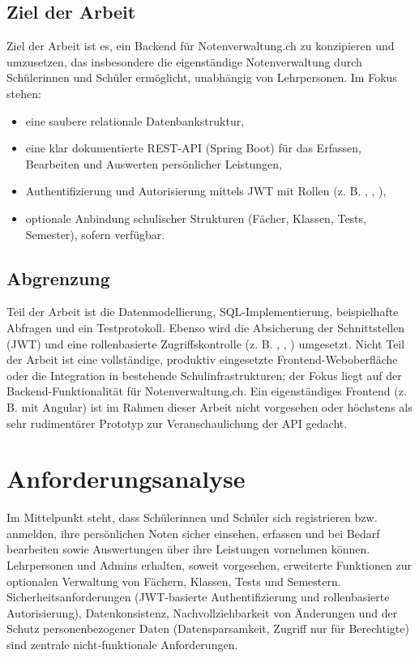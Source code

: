 \documentclass[12pt,a4paper]{article}
\newcommand{\code}[1]{\texttt{\detokenize{#1}}}
\begin{document}
    \subsection{Ziel der Arbeit}
    Ziel der Arbeit ist es, ein Backend für Notenverwaltung.ch zu konzipieren und umzusetzen,
    das insbesondere die eigenständige Notenverwaltung durch Schülerinnen und Schüler ermöglicht, unabhängig von Lehrpersonen. Im Fokus stehen:
    \begin{itemize}
        \item eine saubere relationale Datenbankstruktur,
        \item eine klar dokumentierte REST-API (Spring Boot) für das Erfassen, Bearbeiten und Auswerten persönlicher Leistungen,
        \item Authentifizierung und Autorisierung mittels JWT mit Rollen (z. B. \code{STUDENT}, \code{TEACHER}, \code{ADMIN}),
        \item optionale Anbindung schulischer Strukturen (Fächer, Klassen, Tests, Semester), sofern verfügbar.
    \end{itemize}

    \subsection{Abgrenzung}
    Teil der Arbeit ist die Datenmodellierung, SQL-Implementierung, beispielhafte Abfragen und ein Testprotokoll.
    Ebenso wird die Absicherung der Schnittstellen (JWT) und eine rollenbasierte Zugriffskontrolle
    (z. B. \code{STUDENT}, \code{TEACHER}, \code{ADMIN}) umgesetzt. Nicht Teil der Arbeit ist eine vollständige,
    produktiv eingesetzte Frontend-Weboberfläche oder die Integration in bestehende Schulinfrastrukturen; der Fokus
    liegt auf der Backend-Funktionalität für Notenverwaltung.ch. Ein eigenständiges Frontend (z. B. mit Angular) ist
    im Rahmen dieser Arbeit nicht vorgesehen oder höchstens als sehr rudimentärer Prototyp zur Veranschaulichung der API gedacht.



    \section{Anforderungsanalyse}
    Im Mittelpunkt steht, dass Schülerinnen und Schüler sich registrieren bzw. anmelden, ihre persönlichen Noten sicher einsehen,
    erfassen und bei Bedarf bearbeiten sowie Auswertungen über ihre Leistungen vornehmen können.
    Lehrpersonen und Admins erhalten, soweit vorgesehen, erweiterte Funktionen zur optionalen Verwaltung von Fächern, Klassen, Tests und Semestern.
    Sicherheitsanforderungen (JWT-basierte Authentifizierung und rollenbasierte Autorisierung), Datenkonsistenz, Nachvollziehbarkeit von Änderungen
    und der Schutz personenbezogener Daten (Datensparsamkeit, Zugriff nur für Berechtigte) sind zentrale nicht‑funktionale Anforderungen.
\end{document}
